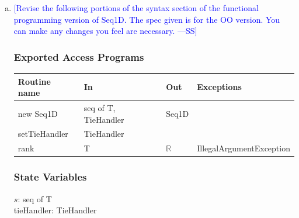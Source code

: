\documentclass[12pt,fleqn]{examtst}
\newcommand{\authornote}[3]{\textcolor{#1}{[#3 ---#2]}}
\newcommand{\authornote}[3]{}
\newcommand{\wss}[1]{\authornote{blue}{SS}{#1}}
\begin{document}
\begin{minipage}{\textwidth}
\begin{enumerate}[a.]
\item \wss{Revise the following portions of the syntax section of the
    functional programming version of Seq1D.  The spec given is for the OO
    version.  You can make any changes you feel are necessary. }

\subsubsection* {Exported Access Programs}

\begin{tabular}{| l | l | l | p{6cm} |}
\hline
\textbf{Routine name} & \textbf{In} & \textbf{Out} & \textbf{Exceptions}\\
\hline
new Seq1D & seq of T, TieHandler & Seq1D & \\
\hline
setTieHandler & TieHandler &  & \\
\hline
rank & T & $\mathbb{R}$ & IllegalArgumentException\\
\hline

\end{tabular}

\subsubsection* {State Variables}

$s$: seq of T\\
tieHandler: TieHandler

\end{enumerate}
\end{minipage}

\end{document}
